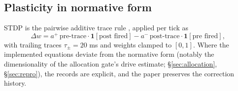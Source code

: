 \subsection{Plasticity in normative form}

STDP is the pairwise additive trace rule
\cite{bipoo1998,gerstner2002}, applied per tick as
\begin{equation}
  \Delta w = a^+\, \text{pre-trace} \cdot \mathbf{1}[\text{post fired}]
            - a^-\, \text{post-trace} \cdot \mathbf{1}[\text{pre fired}],
\end{equation}
with trailing traces \(\tau_\pm=20\) ms and weights clamped to
\([0,1]\). Where the implemented equations deviate from the normative
form (notably the dimensionality of the allocation gate's drive
estimate; \S\ref{sec:allocation}, \S\ref{sec:repro}), the records are
explicit, and the paper preserves the correction history.